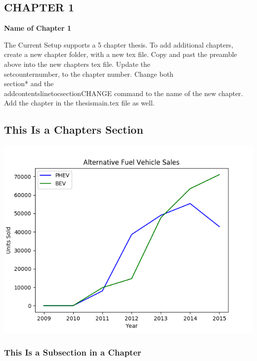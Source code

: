 \begin{center}                                                          %
	\section*{CHAPTER 1}
	\textbf{Name of Chapter 1}                            %
	\setcounter{section}{1}                                             %
	\setcounter{table}{0}                                               %
	\setcounter{figure}{0}                                              %
\end{center}                                                            %
\vspace{5mm}                                                            %

The Current Setup supports a 5 chapter thesis. To add additional chapters, create a new chapter folder, with a new tex file. Copy and past the preamble above into the new chapters tex file. Update the \\setcounter{number}, to the chapter number. Change both \\section*{} and the \\addcontentsline{toc}{section}{CHANGE} command to the name of the new chapter. Add the chapter in the thesismain.tex file as well.


\cite{IndustEclog}

\subsection{This Is a Chapters Section} %

\includegraphics[width=\linewidth]{chapter1/sales}


\subsubsection{This Is a Subsection in a Chapter} %





  




